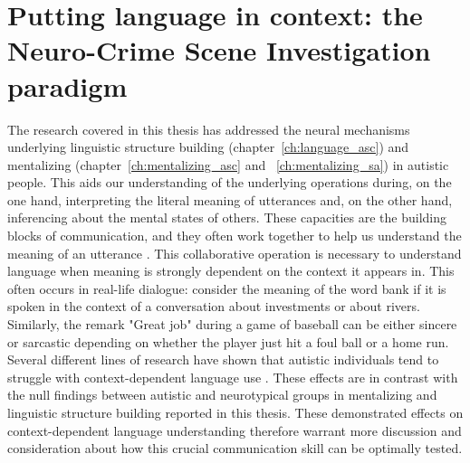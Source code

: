 \section{Putting language in context: the Neuro-Crime Scene Investigation paradigm}

The research covered in this thesis has addressed the neural mechanisms underlying linguistic structure building (chapter~\ref{ch:language_asc}) and mentalizing (chapter~\ref{ch:mentalizing_asc} and ~\ref{ch:mentalizing_sa}) in autistic people. This aids our understanding of the underlying operations during, on the one hand, interpreting the literal meaning of utterances and, on the other hand, inferencing about the mental states of others. These capacities are the building blocks of communication, and they often work together to help us understand the meaning of an utterance \citep{basnakova14beyond,ferstl2007,Xu2005}. This collaborative operation is necessary to understand language when meaning is strongly dependent on the context it appears in. This often occurs in real-life dialogue: consider the meaning of the word bank if it is spoken in the context of a conversation about investments or about rivers. Similarly, the remark "Great job" during a game of baseball can be either sincere or sarcastic depending on whether the player just hit a foul ball or a home run. Several different lines of research have shown that autistic individuals tend to struggle with context-dependent language use \citep{angeleri2016,loukusa2007,wadge2019}. These effects are in contrast with the null findings between autistic and neurotypical groups in mentalizing and linguistic structure building reported in this thesis. These demonstrated effects on context-dependent language understanding therefore warrant more discussion and consideration about how this crucial communication skill can be optimally tested.

